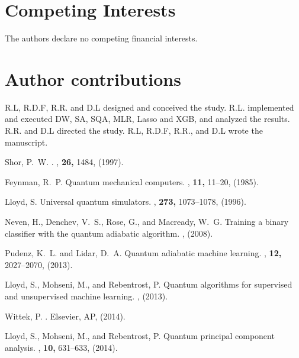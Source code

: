 \documentclass[aps,pra,groupedaddress,nofootinbib,notitlepage,showpacs,floatfix,superscriptaddress]{revtex4-1}
\begin{document}
\section*{Competing Interests}
The authors declare no competing financial interests.

\section*{Author contributions}
R.L, R.D.F, R.R. and D.L designed and conceived the study. R.L. implemented and executed DW, SA, SQA, MLR, Lasso and XGB, and analyzed the results. R.R. and D.L directed the study. R.L, R.D.F, R.R., and D.L wrote the manuscript. 


%
% 

\begin{thebibliography}{10}

Shor, P.~W.
.
, {\bf 26,} 1484, (1997).

Feynman, R.~P.
\newblock Quantum mechanical computers.
, {\bf 11,} 11--20, (1985).

Lloyd, S.
\newblock Universal quantum simulators.
, {\bf 273,} 1073--1078, (1996).

Neven, H., Denchev, V.~S., Rose, G., and Macready, W.~G.
\newblock Training a binary classifier with the quantum adiabatic algorithm.
, (2008).

Pudenz, K.~L. and Lidar, D.~A.
\newblock Quantum adiabatic machine learning.
, {\bf 12,} 2027--2070, (2013).

Lloyd, S., Mohseni, M., and Rebentrost, P.
\newblock Quantum algorithms for supervised and unsupervised machine learning.
, (2013).

Wittek, P.
.
\newblock Elsevier, AP, (2014).

Lloyd, S., Mohseni, M., and Rebentrost, P.
\newblock Quantum principal component analysis.
, {\bf 10,} 631--633, (2014).


\end{thebibliography}
\end{document}
